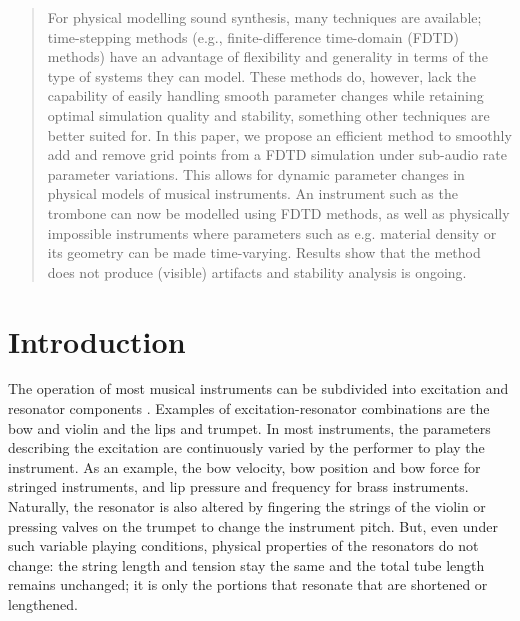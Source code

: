 \begin{abstract}
For physical modelling sound synthesis, many techniques are available; time-stepping methods (e.g., finite-difference time-domain (FDTD) methods) have an advantage of flexibility and generality in terms of the type of systems they can model. These methods do, however, lack the capability of easily handling smooth parameter changes 
while retaining optimal simulation quality and stability, something other techniques are better suited for. In this paper, we propose an efficient method to smoothly add and remove grid points from a FDTD simulation under sub-audio rate parameter variations. This allows for dynamic parameter changes in physical models of musical instruments. An instrument such as the trombone can now be modelled using FDTD methods, as well as physically impossible instruments where parameters such as e.g. material density or its geometry can be made time-varying. Results show that the method does not produce (visible) artifacts and stability analysis is ongoing.


\end{abstract}

\section{Introduction}
The operation of most musical instruments can be subdivided into excitation and resonator components \cite{Borin1989}. Examples of excitation-resonator combinations are the bow and violin and the lips and trumpet. In most instruments, the parameters describing the excitation are continuously varied by the performer to play the instrument. As an example, the bow velocity, bow position and bow force for stringed instruments, and lip pressure and frequency for brass instruments. Naturally, the resonator is also altered by fingering the strings of the violin or pressing valves on the trumpet to change the instrument pitch. But, even under such variable playing conditions, physical properties of the resonators do not change: the string length and tension stay the same and the total tube length remains unchanged; it is only the portions that resonate that are shortened or lengthened.

